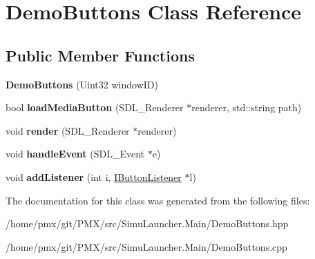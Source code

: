 \hypertarget{classDemoButtons}{}\section{Demo\+Buttons Class Reference}
\label{classDemoButtons}
\subsection*{Public Member Functions}
\begin{DoxyCompactItemize}
\item 
\mbox{\label{classDemoButtons_a0747dd4fdd513f8ab8ae9aeeba4fe06b}} 
{\bfseries Demo\+Buttons} (Uint32 window\+ID)
\item 
\mbox{\label{classDemoButtons_ab63a51fd97a72dd1e7ea7460cfbfe5dc}} 
bool {\bfseries load\+Media\+Button} (S\+D\+L\+\_\+\+Renderer $\ast$renderer, std\+::string path)
\item 
\mbox{\label{classDemoButtons_a6ad40e3ec8fa93ff9968a1b9dcf11ba9}} 
void {\bfseries render} (S\+D\+L\+\_\+\+Renderer $\ast$renderer)
\item 
\mbox{\label{classDemoButtons_a1463f5a85c5b1b3e6484b5531a8e5742}} 
void {\bfseries handle\+Event} (S\+D\+L\+\_\+\+Event $\ast$e)
\item 
\mbox{\label{classDemoButtons_ae07378d55275def13171e820298c2509}} 
void {\bfseries add\+Listener} (int i, \hyperlink{classIButtonListener}{I\+Button\+Listener} $\ast$l)
\end{DoxyCompactItemize}


The documentation for this class was generated from the following files\+:\begin{DoxyCompactItemize}
\item 
/home/pmx/git/\+P\+M\+X/src/\+Simu\+Launcher.\+Main/Demo\+Buttons.\+hpp\item 
/home/pmx/git/\+P\+M\+X/src/\+Simu\+Launcher.\+Main/Demo\+Buttons.\+cpp\end{DoxyCompactItemize}
